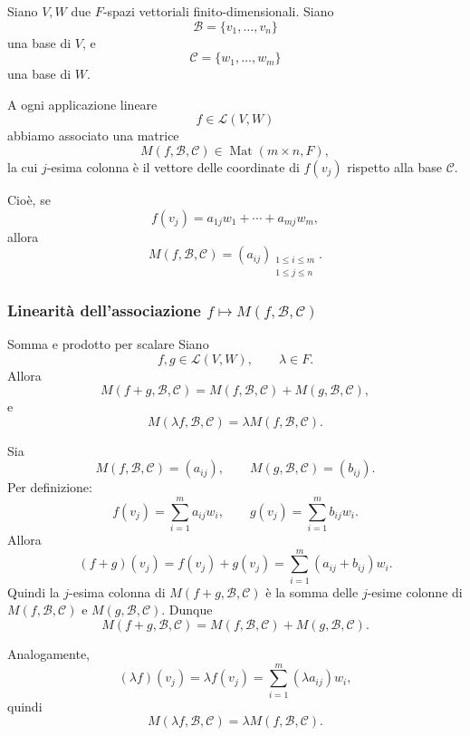 \documentclass[a4paper]{article}
\begin{document}
Siano \(V,W\) due \(F\)-spazi vettoriali finito-dimensionali. Siano
\[
    \mathcal{B}=\{v_1,\ldots,v_n\}
\]
una base di \(V\), e
\[
    \mathcal{C}=\{w_1,\ldots,w_m\}
\]
una base di \(W\).

A ogni applicazione lineare
\[
    f\in\mathcal{L}(V,W)
\]
abbiamo associato una matrice
\[
    M(f,\mathcal{B},\mathcal{C})\in \operatorname{Mat}(m\times n,F),
\]
la cui \(j\)-esima colonna è il vettore delle coordinate di \(f(v_j)\) rispetto alla base \(\mathcal{C}\).

Cioè, se
\[
    f(v_j)=a_{1j}w_1+\cdots+a_{mj}w_m,
\]
allora
\[
    M(f,\mathcal{B},\mathcal{C})
    =
    (a_{ij})_
    {\substack{1\leq i\leq m\\1\leq j\leq n}}.
\]

\subsubsection{Linearità dell'associazione \(f\mapsto M(f,\mathcal{B},\mathcal{C})\)}

\begin{snippetproposition}{Somma e prodotto per scalare}
    Siano
    \[
        f,g\in\mathcal{L}(V,W),
        \qquad
        \lambda\in F.
    \]
    Allora
    \[
        M(f+g,\mathcal{B},\mathcal{C})
        =
        M(f,\mathcal{B},\mathcal{C})
        +
        M(g,\mathcal{B},\mathcal{C}),
    \]
    e
    \[
        M(\lambda f,\mathcal{B},\mathcal{C})
        =
        \lambda M(f,\mathcal{B},\mathcal{C}).
    \]
\end{snippetproposition}

\begin{snippetproof}{}
    Sia
    \[
        M(f,\mathcal{B},\mathcal{C})=(a_{ij}),
        \qquad
        M(g,\mathcal{B},\mathcal{C})=(b_{ij}).
    \]
    Per definizione:
    \[
        f(v_j)=\sum_{i=1}^{m}a_{ij}w_i,
        \qquad
        g(v_j)=\sum_{i=1}^{m}b_{ij}w_i.
    \]
    Allora
    \[
        (f+g)(v_j)
        =
        f(v_j)+g(v_j)
        =
        \sum_{i=1}^{m}(a_{ij}+b_{ij})w_i.
    \]
    Quindi la \(j\)-esima colonna di \(M(f+g,\mathcal{B},\mathcal{C})\) è la somma delle \(j\)-esime colonne di \(M(f,\mathcal{B},\mathcal{C})\) e \(M(g,\mathcal{B},\mathcal{C})\). Dunque
    \[
        M(f+g,\mathcal{B},\mathcal{C})
        =
        M(f,\mathcal{B},\mathcal{C})
        +
        M(g,\mathcal{B},\mathcal{C}).
    \]

    Analogamente,
    \[
        (\lambda f)(v_j)
        =
        \lambda f(v_j)
        =
        \sum_{i=1}^{m}(\lambda a_{ij})w_i,
    \]
    quindi
    \[
        M(\lambda f,\mathcal{B},\mathcal{C})
        =
        \lambda M(f,\mathcal{B},\mathcal{C}).
    \]
\end{snippetproof}
\end{document}
